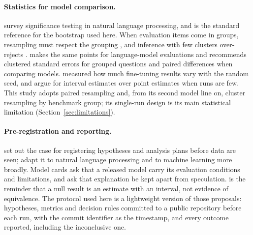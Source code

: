 \paragraph{Statistics for model comparison.}
\citet{dror2018hitchhiker} survey significance testing in natural language processing, and \citet{efron1993bootstrap} is the standard reference for the bootstrap used here. When evaluation items come in groups, resampling must respect the grouping \citep{field2007clustered}, and inference with few clusters over-rejects \citep{cameron2008bootstrap}. \citet{miller2024errorbars} makes the same points for language-model evaluations and recommends clustered standard errors for grouped questions and paired differences when comparing models. \citet{dodge2020finetuning} measured how much fine-tuning results vary with the random seed, and \citet{agarwal2021precipice} argue for interval estimates over point estimates when runs are few. This study adopts paired resampling and, from its second model line on, cluster resampling by benchmark group; its single-run design is its main statistical limitation (Section~\ref{sec:limitations}).

\paragraph{Pre-registration and reporting.}
\citet{nosek2018preregistration} set out the case for registering hypotheses and analysis plans before data are seen; \citet{vanmiltenburg2021preregistering} adapt it to natural language processing and \citet{bertinetto2021preface} to machine learning more broadly. Model cards \citep{mitchell2019modelcards} ask that a released model carry its evaluation conditions and limitations, and \citet{lipton2019troubling} ask that explanation be kept apart from speculation. \citet{altman1995absence} is the reminder that a null result is an estimate with an interval, not evidence of equivalence. The protocol used here is a lightweight version of those proposals: hypotheses, metrics and decision rules committed to a public repository before each run, with the commit identifier as the timestamp, and every outcome reported, including the inconclusive one.
